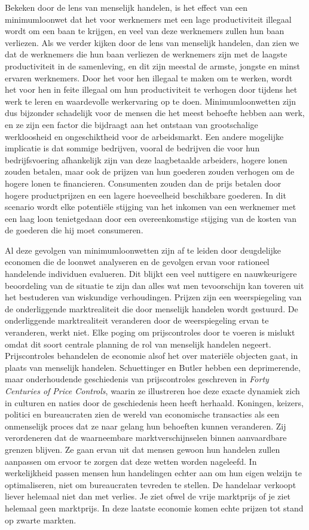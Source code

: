 Bekeken door de lens van menselijk handelen, is het effect van een minimumloonwet dat het voor werknemers met een lage productiviteit illegaal wordt om een baan te krijgen, en veel van deze werknemers zullen hun baan verliezen. Als we verder kijken door de lens van menselijk handelen, dan zien we dat de werknemers die hun baan verliezen de werknemers zijn met de laagste productiviteit in de samenleving, en dit zijn meestal de armste, jongste en minst ervaren werknemers. Door het voor hen illegaal te maken om te werken, wordt het voor hen in feite illegaal om hun productiviteit te verhogen door tijdens het werk te leren en waardevolle werkervaring op te doen. Minimumloonwetten zijn dus bijzonder schadelijk voor de mensen die het meest behoefte hebben aan werk, en ze zijn een factor die bijdraagt aan het ontstaan van grootschalige werkloosheid en ongeschiktheid voor de arbeidsmarkt. Een andere mogelijke implicatie is dat sommige bedrijven, vooral de bedrijven die voor hun bedrijfsvoering afhankelijk zijn van deze laagbetaalde arbeiders, hogere lonen zouden betalen, maar ook de prijzen van hun goederen zouden verhogen om de hogere lonen te financieren. Consumenten zouden dan de prijs betalen door hogere productprijzen en een lagere hoeveelheid beschikbare goederen. In dit scenario wordt elke potentiële stijging van het inkomen van een werknemer met een laag loon tenietgedaan door een overeenkomstige stijging van de kosten van de goederen die hij moet consumeren.

Al deze gevolgen van minimumloonwetten zijn af te leiden door deugdelijke economen die de loonwet analyseren en de gevolgen ervan voor rationeel handelende individuen evalueren. Dit blijkt een veel nuttigere en nauwkeurigere beoordeling van de situatie te zijn dan alles wat men tevoorschijn kan toveren uit het bestuderen van wiskundige verhoudingen. Prijzen zijn een weerspiegeling van de onderliggende marktrealiteit die door menselijk handelen wordt gestuurd. De onderliggende marktrealiteit veranderen door de weerspiegeling ervan te veranderen, werkt niet. Elke poging om prijscontroles door te voeren is mislukt omdat dit soort centrale planning de rol van menselijk handelen negeert. Prijscontroles behandelen de economie alsof het over materiële objecten gaat, in plaats van menselijk handelen. Schuettinger en Butler hebben een deprimerende, maar onderhoudende geschiedenis van prijscontroles geschreven in \textit{Forty Centuries of Price Controls}, waarin ze illustreren hoe deze exacte dynamiek zich in culturen en naties door de geschiedenis heen heeft herhaald.\autocite{12} Koningen, keizers, politici en bureaucraten zien de wereld van economische transacties als een onmenselijk proces dat ze naar gelang hun behoeften kunnen veranderen. Zij verordeneren dat de waarneembare marktverschijnselen binnen aanvaardbare grenzen blijven. Ze gaan ervan uit dat mensen gewoon hun handelen zullen aanpassen om ervoor te zorgen dat deze wetten worden nageleefd. In werkelijkheid passen mensen hun handelingen echter aan om hun eigen welzijn te optimaliseren, niet om bureaucraten tevreden te stellen. De handelaar verkoopt liever helemaal niet dan met verlies. Je ziet ofwel de vrije marktprijs of je ziet helemaal geen marktprijs. In deze laatste economie komen echte prijzen tot stand op zwarte markten.

